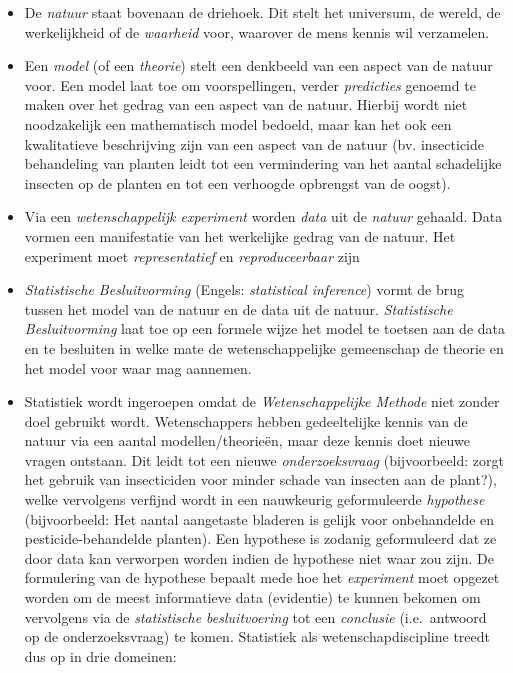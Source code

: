 \documentclass[
  12pt,dutch,coursenotes]{book}
\theoremstyle{definition}
\theoremstyle{definition}
\theoremstyle{definition}
\theoremstyle{remark}
\begin{document}
\begin{itemize}
\item
  De \emph{natuur} staat bovenaan de driehoek. Dit stelt het universum, de wereld, de werkelijkheid of de \emph{waarheid} voor, waarover de mens kennis wil verzamelen.
\item
  Een \emph{model} (of een \emph{theorie}) stelt een denkbeeld van een aspect van de natuur voor. Een model laat toe om voorspellingen, verder \emph{predicties} genoemd te maken over het gedrag van een aspect van de natuur. Hierbij wordt niet noodzakelijk een mathematisch model bedoeld, maar kan het ook een kwalitatieve beschrijving zijn van een aspect van de natuur (bv. insecticide behandeling van planten leidt tot een vermindering van het aantal schadelijke insecten op de planten en tot een verhoogde opbrengst van de oogst).
\item
  Via een \emph{wetenschappelijk experiment} worden \emph{data} uit de \emph{natuur} gehaald. Data vormen een manifestatie van het werkelijke gedrag van de natuur. Het experiment moet \emph{representatief} en \emph{reproduceerbaar} zijn
\item
  \emph{Statistische Besluitvorming} (Engels: \emph{statistical inference}) vormt de brug tussen het model van de natuur en de data uit de natuur. \emph{Statistische Besluitvorming} laat toe op een formele wijze het model te toetsen aan de data en te besluiten in welke mate de wetenschappelijke gemeenschap de theorie en het model voor waar mag aannemen.
\item
  Statistiek wordt ingeroepen omdat de \emph{Wetenschappelijke Methode} niet zonder doel gebruikt wordt. Wetenschappers hebben gedeeltelijke kennis van de natuur via een aantal modellen/theorieën, maar deze kennis doet nieuwe vragen ontstaan. Dit leidt tot een nieuwe \emph{onderzoeksvraag} (bijvoorbeeld: zorgt het gebruik van insecticiden voor minder schade van insecten aan de plant?), welke vervolgens verfijnd wordt in een nauwkeurig geformuleerde \emph{hypothese} (bijvoorbeeld: Het aantal aangetaste bladeren is gelijk voor onbehandelde en pesticide-behandelde planten). Een hypothese is zodanig geformuleerd dat ze door data kan verworpen worden indien de hypothese niet waar zou zijn. De formulering van de hypothese bepaalt mede hoe het \emph{experiment} moet opgezet worden om de meest informatieve data (evidentie) te kunnen bekomen om vervolgens via de \emph{statistische besluitvoering} tot een \emph{conclusie} (i.e.~antwoord op de onderzoeksvraag) te komen. Statistiek als wetenschapdiscipline treedt dus op in drie domeinen:


\end{itemize}
\end{document}
